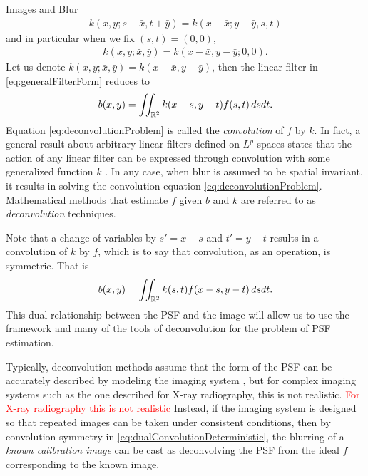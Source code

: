 \begin{chapter}{Images and Blur}
\begin{align}
 k(x,y;s+\bar x,t+\bar y) = k(x-\bar x;y-\bar y,s,t) 
\end{align}
  and in particular when we fix $(s,t) = (0,0)$,
\begin{align} 
 k(x,y;\bar x,\bar y) = k(x-\bar x,y-\bar y;0,0).
\end{align}
  Let us denote $k(x,y;\bar x,\bar y) = k(x-\bar x,y-\bar y)$, then the linear filter in \eqref{eq:generalFilterForm} reduces to   
\begin{equation}\label{eq:deconvolutionProblem}
  b(x,y) = \iint_{\mathbb R^2} k(x-s,y-t) f(s,t)\,dsdt.
\end{equation}
  Equation \eqref{eq:deconvolutionProblem} is called the \emph{convolution} of $f$ by $k$.
  In fact, a general result about arbitrary linear filters defined on $L^p$ spaces states that the action of any linear filter can be expressed through convolution with some generalized function $k$ \citep{grafakos2014}.
  In any case, when blur is assumed to be spatial invariant, it results in solving the convolution equation \eqref{eq:deconvolutionProblem}.
  Mathematical methods that estimate $f$ given $b$ and $k$ are referred to as \emph{deconvolution} techniques.

  Note that a change of variables by $s'=x-s$ and $t'=y-t$ results in a convolution of $k$ by $f$, which is to say that convolution, as an operation, is symmetric.
  That is
\begin{equation}\label{eq:dualConvolutionDeterministic}
  b(x,y) = \iint_{\mathbb R^2} k(s,t) f(x-s,y-t)\,dsdt.
\end{equation}
  This dual relationship between the PSF and the image will allow us to use the framework and many of the tools of deconvolution for the problem of PSF estimation.

  Typically, deconvolution methods assume that the form of the PSF can be accurately described by modeling the imaging system \citep{jain1989,hansen2010}, but for complex imaging systems such as the one described for X-ray radiography, this is not realistic.
  \textcolor{red}{ For X-ray radiography this is not realistic}
  Instead, if the imaging system is designed so that repeated images can be taken under consistent conditions, then by convolution symmetry in \eqref{eq:dualConvolutionDeterministic}, the blurring of a \emph{known calibration image} can be cast as deconvolving the PSF from the ideal $f$ corresponding to the known image.


\end{chapter}
